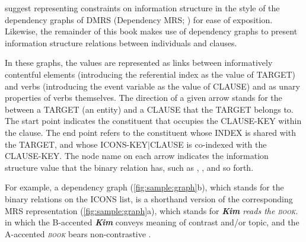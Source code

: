 \citet{song:bender:12} suggest representing constraints on information
structure in the style of the dependency graphs of DMRS (Dependency
MRS; \citealt{copestake:09}) for ease of exposition. Likewise,
the remainder of this book makes use of dependency graphs to present
information structure relations between individuals and clauses.

In these graphs, the  values are represented as links
between informatively contentful elements (introducing the referential
index as the value of TARGET) and verbs (introducing the event
variable as the value of CLAUSE) and as unary properties of verbs
themselves. The direction of a given arrow
stands for the  between a TARGET (an entity) and
a CLAUSE that the TARGET belongs to.  The start point indicates the
constituent that occupies the CLAUSE-KEY within the clause.  The end
point refers to the constituent whose INDEX is shared with the TARGET,
and whose ICONS-KEY{$\mid$}CLAUSE is co-indexed with the
CLAUSE-KEY. The node name on each arrow indicates the
information structure value that the binary relation has, such as
, , and so forth.

For example, a dependency graph (\ref{fig:sample:graph}b), which
stands for the binary relations on the ICONS list, is a shorthand
version of the corresponding MRS representation
(\ref{fig:sample:graph}a), which stands for \textit{\textbf{Kim} reads
  the \textsc{book}}. in which the B-accented \textit{\textbf{Kim}}
conveys meaning of contrast and/or topic, and the
A-accented \textit{\textsc{book}} bears non-contrastive
.


